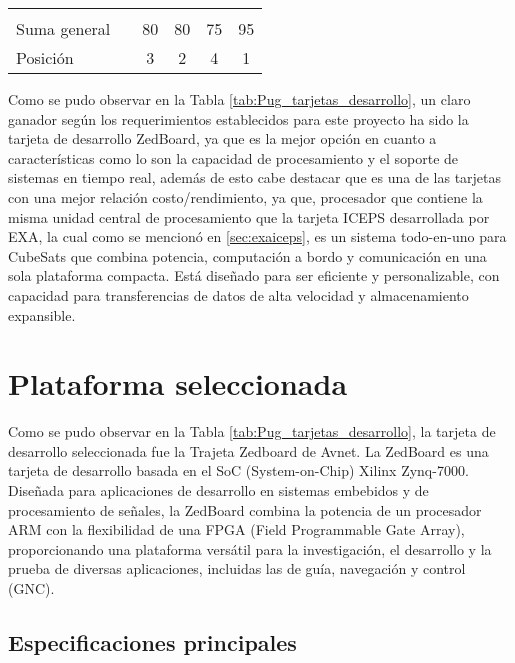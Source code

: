 \begin{table}[h!]
{\begin{tabular}{lccccc}
     & \multicolumn{1}{l}{} & \multicolumn{1}{l}{} & \multicolumn{1}{l}{} & \multicolumn{1}{l}{} & \multicolumn{1}{l}{} \\ \cline{1-1} \cline{3-6} 
    \multicolumn{1}{|l|}{Suma general} & \multicolumn{1}{l|}{} & \multicolumn{1}{c|}{80} & \multicolumn{1}{c|}{80} & \multicolumn{1}{c|}{75} & \multicolumn{1}{c|}{95} \\ \cline{1-1} \cline{3-6} 
    \multicolumn{1}{|l|}{Posición} & \multicolumn{1}{l|}{} & \multicolumn{1}{c|}{3} & \multicolumn{1}{c|}{2} & \multicolumn{1}{c|}{4} & \multicolumn{1}{c|}{1} \\ \cline{1-1} \cline{3-6} 
    \end{tabular}%
    }
\end{table}

Como se pudo observar en la Tabla \ref{tab:Pug_tarjetas_desarrollo}, un claro ganador según los requerimientos establecidos para este proyecto ha sido la tarjeta de desarrollo ZedBoard, ya que es la mejor opción en cuanto a características como lo son la capacidad de procesamiento y el soporte de sistemas en tiempo real, además de esto cabe destacar que es una de las tarjetas con una mejor relación costo/rendimiento, ya que, procesador que contiene la misma unidad central de procesamiento que la tarjeta ICEPS desarrollada por EXA, la cual como se mencionó en \ref{sec:exaiceps}, es un sistema todo-en-uno para CubeSats que combina potencia, computación a bordo y comunicación en una sola plataforma compacta. Está diseñado para ser eficiente y personalizable, con capacidad para transferencias de datos de alta velocidad y almacenamiento expansible.

\section{Plataforma seleccionada}

Como se pudo observar en la Tabla \ref{tab:Pug_tarjetas_desarrollo}, la tarjeta de desarrollo seleccionada fue la Trajeta Zedboard de Avnet. La ZedBoard es una tarjeta de desarrollo basada en el SoC (System-on-Chip) Xilinx Zynq-7000. Diseñada para aplicaciones de desarrollo en sistemas embebidos y de procesamiento de señales, la ZedBoard combina la potencia de un procesador ARM con la flexibilidad de una FPGA (Field Programmable Gate Array), proporcionando una plataforma versátil para la investigación, el desarrollo y la prueba de diversas aplicaciones, incluidas las de guía, navegación y control (GNC).

\subsection{Especificaciones principales}

